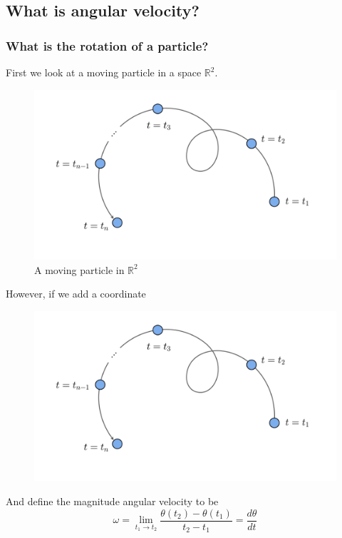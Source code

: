 \documentclass[11pt,]{beamer}
\begin{document}
\subsection{What is angular velocity?}
\begin{frame}
\frametitle{What is the rotation of a particle?}
First we look at a moving particle in a space $\mathbb{R}^2$.
	\begin{figure}
    \includegraphics[page=1, width=0.62\linewidth]{imgs.pdf}
    \caption{A moving particle in $\mathbb{R}^2$}
\end{figure}
\end{frame}
\begin{frame}
	However, if we add a coordinate
	\begin{figure}
    \includegraphics[page=2, width=0.62\linewidth]{imgs.pdf}
	\end{figure}
	And define the magnitude angular velocity to be
	\begin{equation}
	\omega = \lim_{t_1 \to t_2}\frac{\theta(t_2) - \theta(t_1)}{t_2 - t_1} = \frac{d\theta}{dt}
	\end{equation}
\end{frame}
\end{document}
